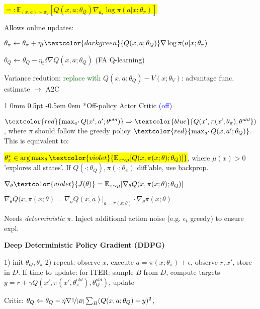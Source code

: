 \documentclass[11pt,landscape,a4paper,fleqn]{article}
\makeatletter
\newcommand*{\rsection}{%
	\@startsection{section}%
	{1}%
	{0mm}%
	{0.5pt}%
	{-0.5em \@plus 0em}
	{\color{myorange}\sffamily\small\bfseries}}
\newcommand{\mhl}[1]{\setlength{\fboxsep}{0pt}\colorbox{yellow}{#1}}
\makeatother
\begin{document}
\begin{multicols*}{4}

	\mhl{$ =: \mathbb{E}_{(x,a) \sim \pi_\theta} [Q(x,a;\theta_Q) \nabla_{\theta_\pi} \log \pi(a | x; \theta_\pi)]$}

	Allows online updates:

	$\theta_\pi \leftarrow \theta_\pi + \eta_t \textcolor{darkgreen}{Q(x,a;\theta_Q)} \nabla \log \pi(a | x; \theta_\pi)$

	$\theta_Q \leftarrow \theta_Q  - \eta_t \delta \nabla Q(x,a;\theta_Q)$ (FA Q-learning)

	Variance redution: \textcolor{darkgreen}{replace with} $Q(x,a;\theta_Q) - V(x; \theta_V)$: advantage func. estimate $\rightarrow$ A2C

	\rsection*{Off-policy Actor Critic} \textcolor{blue}{(off)}

	$\textcolor{red}{\max_{a'} Q(x', a'; \theta^{old})} \Rightarrow \textcolor{blue}{Q(x', \pi(x'; \theta_\pi); \theta^{old}})$,
	where $\pi$ should follow the greedy policy $\textcolor{red}{\max_{a'}Q(x,a'; \theta_Q)}$. This is equivalent to:

	\mhl{$\theta_\pi^* \in \arg\max_\theta \textcolor{violet}{\mathbb{E}_{x \sim \mu} [Q(x,\pi(x;\theta); \theta_Q)]}$},
	where $\mu(x) > 0$ 'explores all states'.
	If $Q(\cdot; \theta_Q), \pi(\cdot; \theta_\pi)$ diff'able, use backprop.

	$\nabla_\theta \textcolor{violet}{J(\theta)} = \mathbb{E}_{x \sim \mu} [\nabla_\theta Q(x,\pi(x;\theta); \theta_Q)]$

	$\nabla_{\theta} Q(x,\pi(x;\theta) = \nabla_a Q(x,a)|_{a = \pi(x;\theta)} \cdot \nabla_{\theta} \pi(x; \theta)$

	Needs \textit{deterministic} $\pi$. Inject additional action noise (e.g. $\epsilon_t$ greedy)
	to ensure expl.

		{\fontsize{9.5}{6}\selectfont \textbf{Deep Deterministic Policy Gradient (DDPG)}}

	1) init $\theta_Q, \theta_\pi$ 2) repeat: observe $x$, execute $a = \pi(x; \theta_\pi) + \epsilon$, observe $r,x'$, store in $D$. If time to update: for ITER: sample $B$ from $D$, compute targets
	$y = r+ \gamma Q(x', \pi(x', \theta_\pi^{old}), \theta_Q^{old})$, update
	\iffalse
		do GD ($\theta_Q$)/ GA ($\theta_\pi$), update $\theta^{old} \leftarrow (1 - \rho) \theta^{old} + \rho \theta$
	\fi

	\iftrue
		Critic: $\theta_Q \leftarrow \theta_Q - \eta \nabla \nicefrac{1}{|B|} \sum_B (Q(x,a;\theta_Q) - y)^2$,


\end{multicols*}
\end{document}
